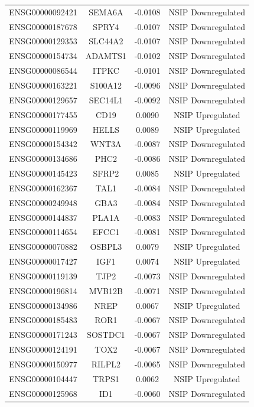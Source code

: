 \documentclass[
]{article}
\begin{document}
\begin{singlespace}
\begin{longtable}[t]{lccc}
\addlinespace
ENSG00000092421 & SEMA6A & -0.0108 & NSIP Downregulated\\
ENSG00000187678 & SPRY4 & -0.0107 & NSIP Downregulated\\
ENSG00000129353 & SLC44A2 & -0.0107 & NSIP Downregulated\\
ENSG00000154734 & ADAMTS1 & -0.0102 & NSIP Downregulated\\
ENSG00000086544 & ITPKC & -0.0101 & NSIP Downregulated\\
\addlinespace
ENSG00000163221 & S100A12 & -0.0096 & NSIP Downregulated\\
ENSG00000129657 & SEC14L1 & -0.0092 & NSIP Downregulated\\
ENSG00000177455 & CD19 & 0.0090 & NSIP Upregulated\\
ENSG00000119969 & HELLS & 0.0089 & NSIP Upregulated\\
ENSG00000154342 & WNT3A & -0.0087 & NSIP Downregulated\\
\addlinespace
ENSG00000134686 & PHC2 & -0.0086 & NSIP Downregulated\\
ENSG00000145423 & SFRP2 & 0.0085 & NSIP Upregulated\\
ENSG00000162367 & TAL1 & -0.0084 & NSIP Downregulated\\
ENSG00000249948 & GBA3 & -0.0084 & NSIP Downregulated\\
ENSG00000144837 & PLA1A & -0.0083 & NSIP Downregulated\\
\addlinespace
ENSG00000114654 & EFCC1 & -0.0081 & NSIP Downregulated\\
ENSG00000070882 & OSBPL3 & 0.0079 & NSIP Upregulated\\
ENSG00000017427 & IGF1 & 0.0074 & NSIP Upregulated\\
ENSG00000119139 & TJP2 & -0.0073 & NSIP Downregulated\\
ENSG00000196814 & MVB12B & -0.0071 & NSIP Downregulated\\
\addlinespace
ENSG00000134986 & NREP & 0.0067 & NSIP Upregulated\\
ENSG00000185483 & ROR1 & -0.0067 & NSIP Downregulated\\
ENSG00000171243 & SOSTDC1 & -0.0067 & NSIP Downregulated\\
ENSG00000124191 & TOX2 & -0.0067 & NSIP Downregulated\\
ENSG00000150977 & RILPL2 & -0.0065 & NSIP Downregulated\\
\addlinespace
ENSG00000104447 & TRPS1 & 0.0062 & NSIP Upregulated\\
ENSG00000125968 & ID1 & -0.0060 & NSIP Downregulated\\

\end{longtable}
\end{singlespace}
\end{document}
